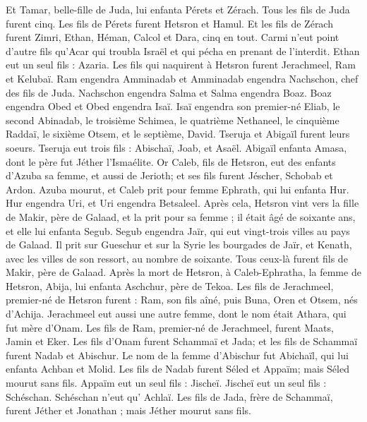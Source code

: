 \begin{multicols}{2}
Et Tamar, belle-fille de Juda, lui enfanta Pérets et Zérach. Tous les fils de Juda furent cinq.
Les fils de Pérets furent Hetsron et Hamul.
Et les fils de Zérach furent Zimri, Ethan, Héman, Calcol et Dara, cinq en tout.
Carmi n'eut point d'autre fils qu'Acar qui troubla Israël et qui pécha en prenant de l'interdit.
Ethan eut un seul fils : Azaria.
Les fils qui naquirent à Hetsron furent Jerachmeel, Ram et Kelubaï.
Ram engendra Amminadab et Amminadab engendra Nachschon, chef des fils de Juda.
Nachschon engendra Salma et Salma engendra Boaz.
Boaz engendra Obed et Obed engendra Isaï.
Isaï engendra son premier-né Eliab, le second Abinadab, le troisième Schimea,
le quatrième Nethaneel, le cinquième Raddaï,
le sixième Otsem, et le septième, David.
Tseruja et Abigaïl furent leurs soeurs. Tseruja eut trois fils : Abischaï, Joab, et Asaël.
Abigaïl enfanta Amasa, dont le père fut Jéther l'Ismaélite.
Or Caleb, fils de Hetsron, eut des enfants d'Azuba sa femme, et aussi de Jerioth; et ses fils furent Jéscher, Schobab et Ardon.
Azuba mourut, et Caleb prit pour femme Ephrath, qui lui enfanta Hur.
Hur engendra Uri, et Uri engendra Betsaleel.
Après cela, Hetsron vint vers la fille de Makir, père de Galaad, et la prit pour sa femme ; il était âgé de soixante ans, et elle lui enfanta Segub.
Segub engendra Jaïr, qui eut vingt-trois villes au pays de Galaad.
Il prit sur Gueschur et sur la Syrie les bourgades de Jaïr, et Kenath, avec les villes de son ressort, au nombre de soixante. Tous ceux-là furent fils de Makir, père de Galaad.
Après la mort de Hetsron, à Caleb-Ephratha, la femme de Hetsron, Abija, lui enfanta Aschchur, père de Tekoa.
Les fils de Jerachmeel, premier-né de Hetsron furent : Ram, son fils aîné, puis Buna, Oren et Otsem, nés d'Achija.
Jerachmeel eut aussi une autre femme, dont le nom était Athara, qui fut mère d'Onam.
Les fils de Ram, premier-né de Jerachmeel, furent Maats, Jamin et Eker.
Les fils d'Onam furent Schammaï et Jada; et les fils de Schammaï furent Nadab et Abischur.
Le nom de la femme d'Abischur fut Abichaïl, qui lui enfanta Achban et Molid.
Les fils de Nadab furent Séled et Appaïm; mais Séled mourut sans fils.
Appaïm eut un seul fils : Jischeï. Jischeï eut un seul fils : Schéschan. Schéschan n'eut qu' Achlaï.
Les fils de Jada, frère de Schammaï, furent Jéther et Jonathan ; mais Jéther mourut sans fils.

\end{multicols}
